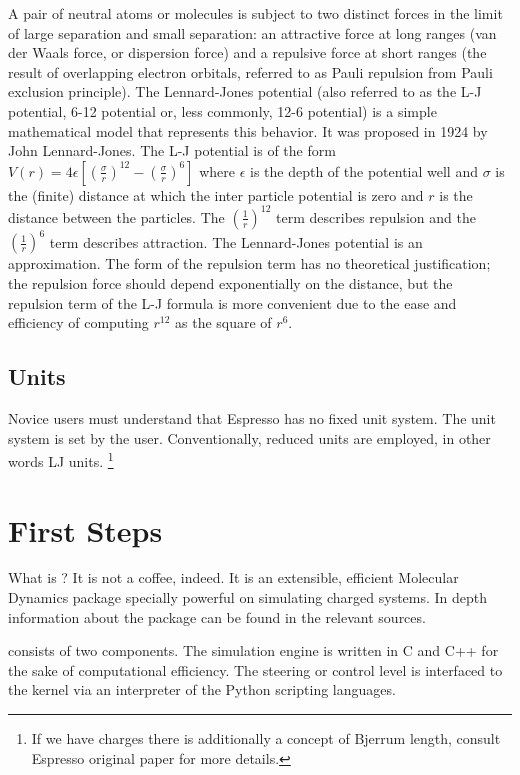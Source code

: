 \documentclass[
paper=a4,                       %
fontsize=11pt,                  %
twoside,                        %
footsepline,                    %
headsepline,                    %
headinclude=false,              %
footinclude=false,              %
pagesize,                       %
]{scrartcl}
\begin{document}
A pair of neutral atoms or molecules is subject to two distinct forces in the limit
of large separation and small separation: an attractive force at long ranges (van der
Waals force, or dispersion force) and a repulsive force at short ranges (the result
of overlapping electron orbitals, referred to as Pauli repulsion from Pauli exclusion
principle). The Lennard-Jones potential (also referred to as the L-J potential, 6-12
potential or, less commonly, 12-6 potential) is a simple mathematical model that
represents this behavior. It was proposed in 1924 by John Lennard-Jones. The L-J
potential is of the form
\begin{math}
\label{eq:lj}
    V(r) = 4\epsilon [{({\frac{\sigma}{r}})}^{12} - (\frac{\sigma}{r})^{6}]
\end{math}
where $\epsilon$ is the depth of the potential well and $\sigma$ is the (finite)
distance at which the inter particle potential is zero and $r$ is the distance between
the particles. The $(\frac{1}{r})^{12}$ term describes repulsion and the
$(\frac{1}{r})^{6}$  term describes attraction. The Lennard-Jones potential is an
approximation. The form of the repulsion term has no theoretical justification; the
repulsion force should depend exponentially on the distance, but the repulsion term
of the L-J formula is more convenient due to the ease and efficiency of computing
$r^{12}$ as the square of $r^6$.

\subsection{Units}

Novice users must understand that Espresso has no fixed unit system. The unit 
system is set by the user. Conventionally, reduced units are employed, in other 
words LJ units.
\footnote{If we have charges there is additionally a concept of Bjerrum length, consult Espresso original paper for more details.} 

\section{First Steps}\label{sec:espresso}

What is \es{}? It is not a coffee, indeed. It is an extensible, efficient 
Molecular Dynamics package specially powerful on simulating charged systems. 
In depth information about the package can be found in the relevant sources\cite{esp_url,arnold2003ees,limbach2006ees,arnold13a}.

\es consists of two components.
The simulation engine is written in C and C++ for the sake
of computational efficiency. The steering or control
level is interfaced to the kernel via an interpreter 
of the Python scripting languages.
\end{document}
